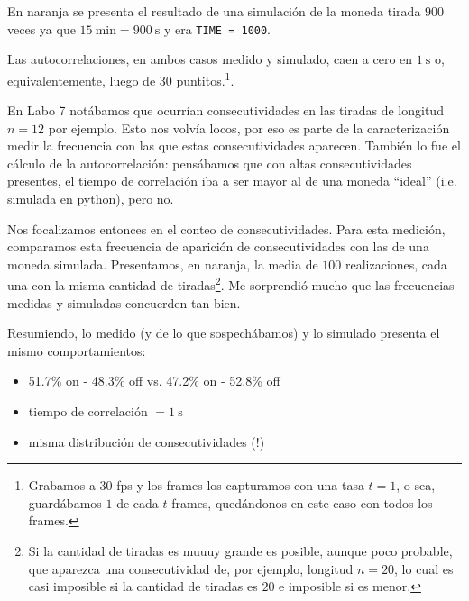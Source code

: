 \documentclass[a4paper]{article}
\begin{document}
En naranja se presenta el resultado de una simulación de la moneda tirada $900$ veces ya que $\SI{15}{\minute} = \SI{900}{\second}$ y era \texttt{TIME = 1000}.

Las autocorrelaciones, en ambos casos medido y simulado, caen a cero en $\SI{1}{\second}$ o, equivalentemente, luego de $30$ puntitos.\footnote{Grabamos a $30$ fps y los frames los capturamos con una tasa $t = 1$, o sea, guardábamos $1$ de cada $t$ frames, quedándonos en este caso con todos los frames.}.

En Labo 7 notábamos que ocurrían consecutividades en las tiradas de longitud $n=12$ por ejemplo. Esto nos volvía locos, por eso es parte de la caracterización medir la frecuencia con las que estas consecutividades aparecen. También lo fue el cálculo de la autocorrelación: pensábamos que con altas consecutividades presentes, el tiempo de correlación iba a ser mayor al de una moneda ``ideal'' (i.e. simulada en python), pero no.



Nos focalizamos entonces en el conteo de consecutividades. Para esta medición, comparamos esta frecuencia de aparición de consecutividades con las de una moneda simulada. Presentamos, en naranja, la media de $100$ realizaciones, cada una con la misma cantidad de tiradas\footnote{Si la cantidad de tiradas es muuuy grande es posible, aunque poco probable, que aparezca una consecutividad de, por ejemplo, longitud $n=20$, lo cual es casi imposible si la cantidad de tiradas es $20$ e imposible si es menor.}. Me sorprendió mucho que las frecuencias medidas y simuladas concuerden tan bien. 

Resumiendo, lo medido (y de lo que sospechábamos) y lo simulado presenta el mismo comportamientos:
\begin{itemize}
	\item 51.7\% on - 48.3\% off vs. 47.2\% on - 52.8\% off
	\item tiempo de correlación $= \SI{1}{\second}$
	\item misma distribución de consecutividades (!)
\end{itemize}
\end{document}
